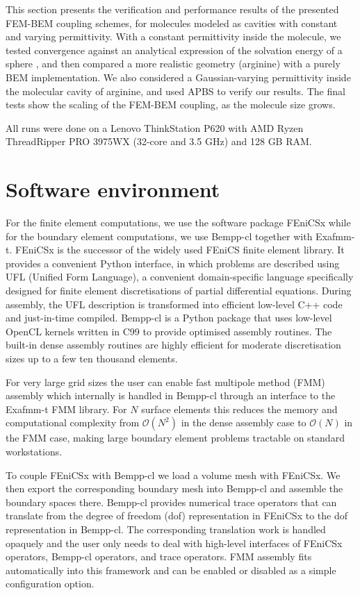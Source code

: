 This section presents the verification and performance results of the presented FEM-BEM coupling schemes, for molecules modeled as cavities with constant and varying permittivity.
With a constant permittivity inside the molecule, we tested convergence against an analytical expression of the solvation energy of a sphere \cite{Kirkwood1934}, and then compared a more realistic geometry (arginine) with a purely BEM implementation.
We also considered a Gaussian-varying permittivity\cite{grant2001smooth,li2013dielectric} inside the molecular cavity of arginine, and used APBS \cite{BakerETal2001} to verify our results.
The final tests show the scaling of the FEM-BEM coupling, as the molecule size grows. 

All runs were done on a Lenovo ThinkStation P620 with AMD Ryzen ThreadRipper PRO 3975WX (32-core and 3.5 GHz) and 128 GB RAM. 

\section*{\sffamily \Large Software environment}

For the finite element computations, we use the software package FEniCSx while for the boundary element computations, we use Bempp-cl together with Exafmm-t. FEniCSx is the successor of the widely used FEniCS finite element library.
It provides a convenient Python interface, in which problems are described using UFL (Unified Form Language), a convenient domain-specific language specifically designed for finite element discretisations of partial differential equations. During assembly, the UFL description is transformed into efficient low-level C++ code and just-in-time compiled. Bempp-cl is a Python package that uses low-level OpenCL kernels written in C99 to provide optimised assembly routines. The built-in dense assembly routines are highly efficient for moderate discretisation sizes up to a few ten thousand elements.

For very large grid sizes the user can enable fast multipole method (FMM) assembly which internally is handled in Bempp-cl through an interface to the Exafmm-t FMM library. For $N$ surface elements this reduces the memory and computational complexity from $\mathcal{O}(N^2)$ in the dense assembly case to $\mathcal{O}(N)$ in the FMM case, making large boundary element problems tractable on standard workstations.

To couple FEniCSx with Bempp-cl we load a volume mesh with FEniCSx. We then export the corresponding boundary mesh into Bempp-cl and assemble the boundary spaces there. Bempp-cl provides numerical trace operators that can translate from the degree of freedom (dof) representation in FEniCSx to the dof representation in Bempp-cl. The corresponding translation work is handled opaquely and the user only needs to deal with high-level interfaces of FEniCSx operators, Bempp-cl operators, and trace operators. FMM assembly fits automatically into this framework and can be enabled or disabled as a simple configuration option.

